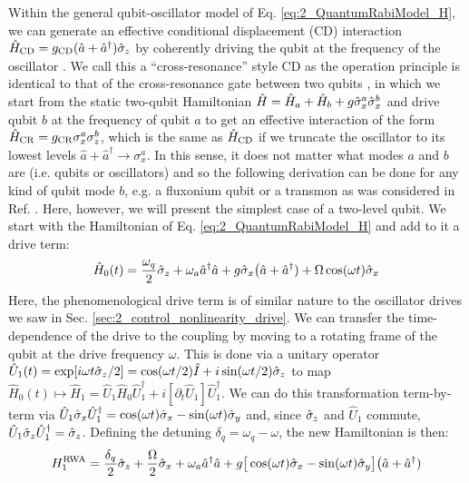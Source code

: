 Within the general qubit-oscillator model of Eq. \eqref{eq:2_QuantumRabiModel_H}, we can generate an effective conditional displacement (CD) interaction $\hat{H}_{\rm CD} = g_{\rm CD}(\hat{a} + \hat{a}^\dagger)\hat{\sigma}_z$ by coherently driving the qubit at the frequency of the oscillator \cite{touzard2019gated}. We call this a ``cross-resonance'' style CD as the operation principle is identical to that of the cross-resonance gate between two qubits \cite{rigetti2010fully}, in which we start from the static two-qubit Hamiltonian $\hat{H} = \hat{H}_a + \hat{H}_b + g\hat{\sigma}_x^a\hat{\sigma}_x^b$ and drive qubit $b$ at the frequency of qubit $a$ to get an effective interaction of the form  $\hat{H}_{\rm CR} = g_{\rm CR}\sigma_x^a\sigma_z^b$, which is the same as $\hat{H}_{\rm CD}$ if we truncate the oscillator to its lowest levels $\hat{a} + \hat{a}^\dagger \to \sigma_x^a$. In this sense, it does not matter what modes $a$ and $b$ are (i.e. qubits or oscillators) and so the following derivation can be done for any kind of qubit mode $b$, e.g. a fluxonium qubit or a transmon as was considered in Ref. \cite{touzard2019gated}. Here, however, we will present the simplest case of a two-level qubit. We start with the Hamiltonian of Eq. \eqref{eq:2_QuantumRabiModel_H} and add to it a drive term:
\begin{equation}
\hat{H}_0(t) = \frac{\omega_q}{2}\hat{\sigma}_z + \omega_a \hat{a}^\dagger \hat{a} + g\hat{\sigma}_x\big(\hat{a} + \hat{a}^\dagger) + \Omega \cos(\omega t)\hat{\sigma}_x
\label{eq:CR_CR_initial_eq}
\end{equation}
Here, the phenomenological drive term is of similar nature to the oscillator drives we saw in Sec. \ref{sec:2_control_nonlinearity_drive}. We can transfer the time-dependence of the drive to the coupling by moving to a rotating frame of the qubit at the drive frequency $\omega$. This is done via a unitary operator $\hat{U}_1(t) = \exp[i\omega t \hat{\sigma}_z / 2] = \cos(\omega t/2)\hat{I} +i\sin(\omega t/2)\hat{\sigma}_z$ to map $\hat{H}_0(t) \mapsto \hat{H}_1 = \hat{U}_1\hat{H}_0\hat{U}_1^\dagger + i[\partial_t \hat{U}_1]\hat{U}_1^\dagger$. We can do this transformation term-by-term  via $\hat{U}_1\hat{\sigma}_x\hat{U}_1^\dagger = \cos(\omega t)\hat{\sigma}_x - \sin(\omega t)\hat{\sigma}_y$ and, since $\hat{\sigma}_z$ and $\hat{U}_1$ commute, $\hat{U}_1\hat{\sigma}_z\hat{U}_1^\dagger = \hat{\sigma}_z$. Defining the detuning $\delta_q = \omega_q - \omega$, the new Hamiltonian is then: 
\begin{equation}
H_1^{\rm RWA} = \frac{\delta_q}{2}\hat{\sigma}_z + \frac{\Omega}{2}\hat{\sigma}_x + \omega_a \hat{a}^\dagger \hat{a} + g\big[\cos(\omega t)\hat{\sigma}_x - \sin(\omega t)\hat{\sigma}_y\big]\big(\hat{a} + \hat{a}^\dagger)
\end{equation}

